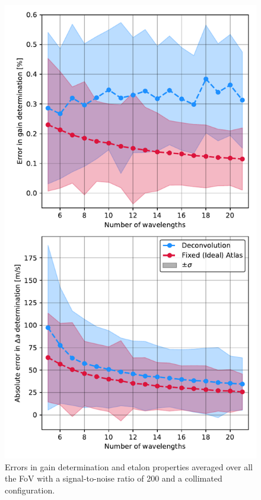 \begin{figure}
    \centering
     \includegraphics[width=\textwidth]{figures/EtalonPaper/Deconvolution_results.pdf}
    \caption{Errors in gain determination and etalon properties averaged over all the FoV with a signal-to-noise ratio of 200 and a collimated configuration.}
    \label{fig_etalon_corr:Deconvolution-results}
\end{figure}

